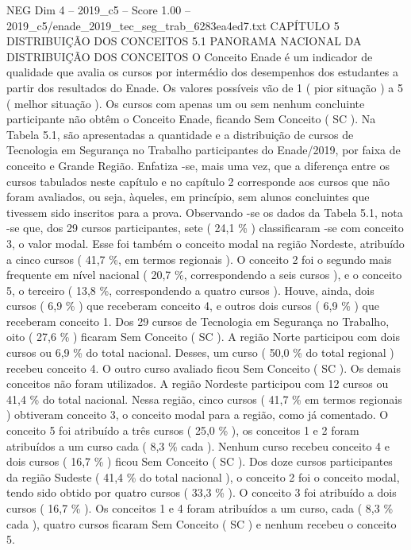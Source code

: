 \begin{textsample}{NEG Dim 4 – 2019\_c5 – Score 1.00 – 2019\_c5/enade\_2019\_tec\_seg\_trab\_6283ea4ed7.txt}  \label{ex:f4_neg_160}
CAPÍTULO 5 DISTRIBUIÇÃO DOS CONCEITOS 5.1 PANORAMA NACIONAL DA DISTRIBUIÇÃO DOS CONCEITOS O Conceito Enade é um indicador de qualidade que avalia os cursos por intermédio dos desempenhos dos estudantes a partir dos resultados do Enade.
Os valores possíveis vão de 1 ( pior situação ) a 5 ( melhor situação ).
Os cursos com apenas um ou sem nenhum concluinte participante não obtêm o Conceito Enade, ficando Sem Conceito ( SC ).
Na Tabela 5.1, são apresentadas a quantidade e a distribuição de cursos de Tecnologia em Segurança no Trabalho participantes do Enade/2019, por faixa de conceito e Grande Região.
Enfatiza -se, mais uma vez, que a diferença entre os cursos tabulados neste capítulo e no capítulo 2 corresponde aos cursos que não foram avaliados, ou seja, àqueles, em princípio, sem alunos concluintes que tivessem sido inscritos para a prova.
Observando -se os dados da Tabela 5.1, nota -se que, dos 29 cursos participantes, sete ( 24,1 \% ) classificaram -se com conceito 3, o valor modal.
Esse foi também o conceito modal na região Nordeste, atribuído a cinco cursos ( 41,7 \%, em termos regionais ).
O conceito 2 foi o segundo mais frequente em nível nacional ( 20,7 \%, correspondendo a seis cursos ), e o conceito 5, o terceiro ( 13,8 \%, correspondendo a quatro cursos ).
Houve, ainda, dois cursos ( 6,9 \% ) que receberam conceito 4, e outros dois cursos ( 6,9 \% ) que receberam conceito 1.
Dos 29 cursos de Tecnologia em Segurança no Trabalho, oito ( 27,6 \% ) ficaram Sem Conceito ( SC ).
A região Norte participou com dois cursos ou 6,9 \% do total nacional.
Desses, um curso ( 50,0 \% do total regional ) recebeu conceito 4.
O outro curso avaliado ficou Sem Conceito ( SC ).
Os demais conceitos não foram utilizados.
A região Nordeste participou com 12 cursos ou 41,4 \% do total nacional.
Nessa região, cinco cursos ( 41,7 \% em termos regionais ) obtiveram conceito 3, o conceito modal para a região, como já comentado.
O conceito 5 foi atribuído a três cursos ( 25,0 \% ), os conceitos 1 e 2 foram atribuídos a um curso cada ( 8,3 \% cada ).
Nenhum curso recebeu conceito 4 e dois cursos ( 16,7 \% ) ficou Sem Conceito ( SC ).
Dos doze cursos participantes da região Sudeste ( 41,4 \% do total nacional ), o conceito 2 foi o conceito modal, tendo sido obtido por quatro cursos ( 33,3 \% ).
O conceito 3 foi atribuído a dois cursos ( 16,7 \% ).
Os conceitos 1 e 4 foram atribuídos a um curso, cada ( 8,3 \% cada ), quatro cursos ficaram Sem Conceito ( SC ) e nenhum recebeu o conceito 5.

\end{textsample}
